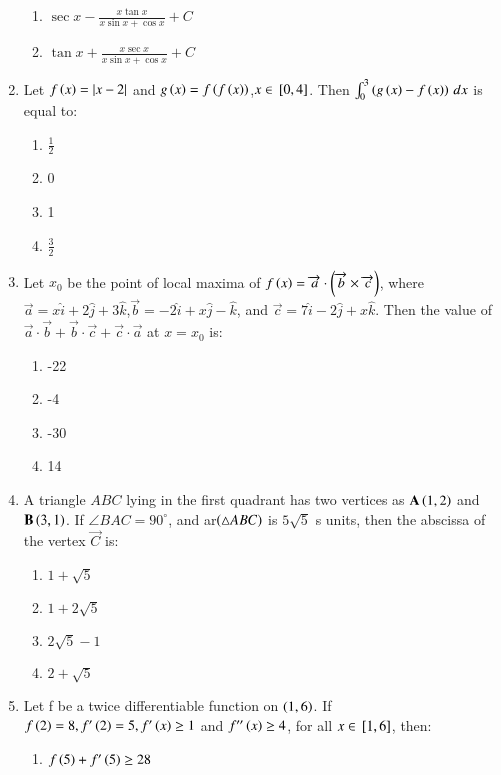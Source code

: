 \documentclass[journal,12pt,onecolumn,draftclsnofoot]{IEEEtran}
\theoremstyle{remark}
\begin{document}
\begin{enumerate}
\begin{enumerate}
    \item $\sec x-\frac{x\tan x}{x\sin x+\cos x}+C$
    \item $\tan x+\frac{x\sec x}{x \sin x + \cos x}+C$
\end{enumerate}
\item Let $f\left(x\right)=\left\vert x-2\right\vert$ and $g\left(x\right)=f\left(f\left(x\right)\right)$,$x\in {}\left[0, 4\right]$. Then $\int_0^3 \left(g\left(x\right)-f\left(x\right)\right)\, dx$ is equal to:
\begin{enumerate}
    \item $\frac{1}{2}$
    \item 0
    \item 1
    \item $\frac{3}{2}$
\end{enumerate}
\item Let $x_0$ be the point of local maxima of $f\left(x\right)=\overrightarrow{a}\cdot\left(\overrightarrow{b}\times \overrightarrow{c}\right)$, where $\overrightarrow{a}=x\hat{i}+2\hat{j}+3\hat{k}$,$\overrightarrow{b}=-2\hat{i}+x\hat{j}-\hat{k}$, and $\overrightarrow{c}=7\hat{i}-2\hat{j}+x\hat{k}$. Then the value of $ \overrightarrow{a}\cdot \overrightarrow{b}+\overrightarrow{b}\cdot \overrightarrow{c}+\overrightarrow{c}\cdot \overrightarrow{a}$ at $x=x_0$ is:
\begin{enumerate}
    \item -22
    \item -4
    \item -30
    \item 14
\end{enumerate}
\item A triangle $ABC$ lying in the first quadrant has two vertices as $ \mathbf{A}\left(1,2\right)$ and $\mathbf{B}\left(3,1\right)$. If $\angle BAC=90^\circ$, and ar$\left(\triangle ABC\right)$ is $5\sqrt{5}$ s units, then the abscissa of the vertex $\vec{C}$ is:
\begin{enumerate}
    \item $1+\sqrt{5}$
    \item $1+2\sqrt{5}$
    \item $2\sqrt{5}-1$
    \item $2+\sqrt{5}$
\end{enumerate}
\item Let f be a twice differentiable function on $\left(1,6\right)$. If $f\left(2\right)=8, f^\prime\left(2\right)=5, f^\prime\left(x\right)\geq1$ and $f'^\prime\left(x\right)\geq4$, for all $x\in {}\left[1,6\right]$, then:
\begin{enumerate}
    \item $f\left(5\right)+f^\prime\left(5\right)\geq28$

\end{enumerate}
\end{enumerate}
\end{document}

